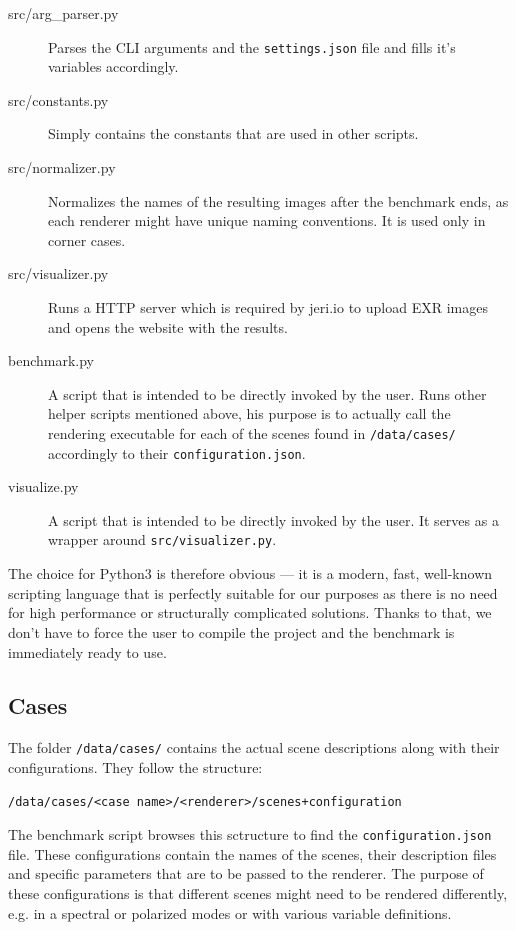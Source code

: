\begin{description}
	\item[src/arg\_parser.py] Parses the CLI arguments and the \texttt{settings.json} file and fills it's variables accordingly.
	\item[src/constants.py] Simply contains the constants that are used in other scripts.
	\item[src/normalizer.py] Normalizes the names of the resulting images after the benchmark ends, as each renderer might have unique naming conventions. It is used only in corner cases.
	\item[src/visualizer.py] Runs a HTTP server which is required by jeri.io to upload EXR images and opens the website with the results.
	\item[benchmark.py] A script that is intended to be directly invoked by the user. Runs other helper scripts mentioned above, his purpose is to actually call the rendering executable for each of the scenes found in \texttt{/data/cases/} accordingly to their \texttt{configuration.json}.
	\item[visualize.py] A script that is intended to be directly invoked by the user. It serves as a wrapper around \texttt{src/visualizer.py}.
\end{description}

The choice for Python3 is therefore obvious --- it is a modern, fast, well-known scripting language that is perfectly suitable for our purposes as there is no need for high performance or structurally complicated solutions. Thanks to that, we don't have to force the user to compile the project and the benchmark is immediately ready to use.

\subsection{Cases}

The folder \texttt{/data/cases/} contains the actual scene descriptions along with their configurations. They follow the structure:

\begin{lstlisting}
/data/cases/<case name>/<renderer>/scenes+configuration
\end{lstlisting}

The benchmark script browses this sctructure to find the \texttt{configuration.json} file. These configurations contain the names of the scenes, their description files and specific parameters that are to be passed to the renderer. The purpose of these configurations is that different scenes might need to be rendered differently, e.g. in a spectral or polarized modes or with various variable definitions.

